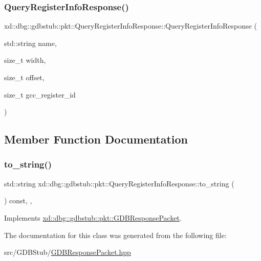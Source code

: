\subsubsection{\texorpdfstring{Query\+Register\+Info\+Response()}{QueryRegisterInfoResponse()}}
{\footnotesize\ttfamily xd\+::dbg\+::gdbstub\+::pkt\+::\+Query\+Register\+Info\+Response\+::\+Query\+Register\+Info\+Response (\begin{DoxyParamCaption}\item[{std\+::string}]{name,  }\item[{size\+\_\+t}]{width,  }\item[{size\+\_\+t}]{offset,  }\item[{size\+\_\+t}]{gcc\+\_\+register\+\_\+id }\end{DoxyParamCaption})\hspace{0.3cm}{\ttfamily [inline]}}



\subsection{Member Function Documentation}
\mbox{\label{classxd_1_1dbg_1_1gdbstub_1_1pkt_1_1_query_register_info_response_a8457843896d4af60c23846aab4463469}} 
\subsubsection{\texorpdfstring{to\+\_\+string()}{to\_string()}}
{\footnotesize\ttfamily std\+::string xd\+::dbg\+::gdbstub\+::pkt\+::\+Query\+Register\+Info\+Response\+::to\+\_\+string (\begin{DoxyParamCaption}{ }\end{DoxyParamCaption}) const\hspace{0.3cm}{\ttfamily [inline]}, {\ttfamily [override]}, {\ttfamily [virtual]}}



Implements \mbox{\hyperlink{classxd_1_1dbg_1_1gdbstub_1_1pkt_1_1_g_d_b_response_packet_a2a15795536cd5ff94f0533c406233874}{xd\+::dbg\+::gdbstub\+::pkt\+::\+G\+D\+B\+Response\+Packet}}.



The documentation for this class was generated from the following file\+:\begin{DoxyCompactItemize}
\item 
src/\+G\+D\+B\+Stub/\mbox{\hyperlink{_g_d_b_response_packet_8hpp}{G\+D\+B\+Response\+Packet.\+hpp}}\end{DoxyCompactItemize}
